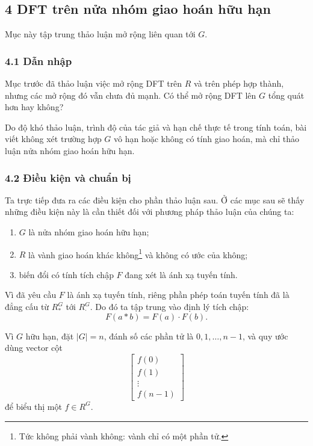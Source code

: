 \documentclass[11pt]{article}
\begin{document}
\subsection*{4 DFT trên nửa nhóm giao hoán hữu hạn}

Mục này tập trung thảo luận mở rộng liên quan tới \(G\).

\subsubsection*{4.1 Dẫn nhập}

Mục trước đã thảo luận việc mở rộng DFT trên \(R\) và trên phép hợp thành,
nhưng các mở rộng đó vẫn chưa đủ mạnh. Có thể mở rộng DFT lên \(G\) tổng quát
hơn hay không?

Do độ khó thảo luận, trình độ của tác giả và hạn chế thực tế trong tính toán,
bài viết không xét trường hợp \(G\) vô hạn hoặc không có tính giao hoán, mà chỉ
thảo luận nửa nhóm giao hoán hữu hạn.

\subsubsection*{4.2 Điều kiện và chuẩn bị}

Ta trực tiếp đưa ra các điều kiện cho phần thảo luận sau. Ở các mục sau sẽ thấy
những điều kiện này là cần thiết đối với phương pháp thảo luận của chúng ta:
\begin{enumerate}
  \item \(G\) là nửa nhóm giao hoán hữu hạn;
  \item \(R\) là vành giao hoán khác không\footnote{Tức không phải vành không:
  vành chỉ có một phần tử.} và không có ước của không;
  \item biến đổi có tính tích chập \(F\) đang xét là ánh xạ tuyến tính.
\end{enumerate}

Vì đã yêu cầu \(F\) là ánh xạ tuyến tính, riêng phần phép toán tuyến tính đã là
đẳng cấu từ \(R^G_*\) tới \(R^G_{\cdot}\). Do đó ta tập trung vào định lý tích
chập:
\[
  F(a*b)=F(a)\cdot F(b).
\]

Vì \(G\) hữu hạn, đặt \(|G|=n\), đánh số các phần tử là \(0,1,\ldots,n-1\), và
quy ước dùng vector cột
\[
  \begin{bmatrix}
    f(0)\\f(1)\\\vdots\\f(n-1)
  \end{bmatrix}
\]
để biểu thị một \(f\in R^G\).
\end{document}
